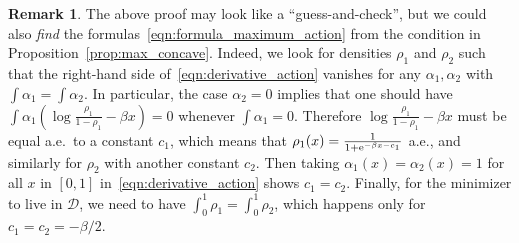 \documentclass[a4paper,11pt]{amsart}
\newcommand{\ee}{\textup{e}}
\theoremstyle{definition}
\newtheorem{rem}[thm]{Remark}
\begin{document}
\begin{rem}\label{rem:equadiff}
The above proof may look like a ``guess-and-check'', but we could also \emph{find} the formulas~\eqref{eqn:formula_maximum_action} from the condition in Proposition~\ref{prop:max_concave}. Indeed, we look for densities $\rho_1$ and $\rho_2$ such that the right-hand side of~\eqref{eqn:derivative_action} vanishes for any $\alpha_1, \alpha_2$ with $\int \alpha_1=\int \alpha_2$.
In particular, the case $\alpha_2=0$ implies that one should have $\int \alpha_1 \left( \log \frac{\rho_1}{1-\rho_1}-\beta x \right)=0$ whenever $\int \alpha_1=0$. Therefore $\log \frac{\rho_1}{1-\rho_1}-\beta x$ must be equal a.e.~to a constant $c_1$, which means that $\rho_1(x)=\frac{1}{1+\ee^{-\beta x-c_1}}$ a.e., and similarly for $\rho_2$ with another constant $c_2$. Then taking $\alpha_1(x)=\alpha_2(x)=1$ for all $x$ in $[0,1]$ in~\eqref{eqn:derivative_action} shows $c_1=c_2$. Finally, for the minimizer to live in $\mathcal D$, we need to have $\int_0^1 \rho_1=\int_0^1 \rho_2$, which happens only for $c_1=c_2=-\beta/2$.
\end{rem}

\end{document}
